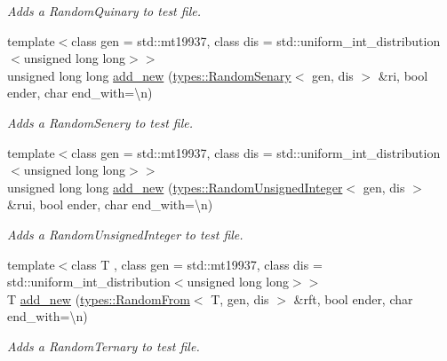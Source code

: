 \begin{DoxyCompactItemize}
\begin{DoxyCompactList}\small\item\em Adds a Random\+Quinary to test file. \end{DoxyCompactList}\item 
{\footnotesize template$<$class gen  = std\+::mt19937, class dis  = std\+::uniform\+\_\+int\+\_\+distribution$<$unsigned long long$>$$>$ }\\unsigned long long \mbox{\hyperlink{classtestcaser_1_1maker_1_1TestCaseBuilder_a6317c09b2b8896fb4da31f1daf401ff6}{add\+\_\+new}} (\mbox{\hyperlink{structtestcaser_1_1maker_1_1types_1_1RandomSenary}{types\+::\+Random\+Senary}}$<$ gen, dis $>$ \&ri, bool ender, char end\+\_\+with=\textquotesingle{}\textbackslash{}n\textquotesingle{})
\begin{DoxyCompactList}\small\item\em Adds a Random\+Senery to test file. \end{DoxyCompactList}\item 
{\footnotesize template$<$class gen  = std\+::mt19937, class dis  = std\+::uniform\+\_\+int\+\_\+distribution$<$unsigned long long$>$$>$ }\\unsigned long long \mbox{\hyperlink{classtestcaser_1_1maker_1_1TestCaseBuilder_a2aca9bbe3ad8017be98e4bb53e04face}{add\+\_\+new}} (\mbox{\hyperlink{classtestcaser_1_1maker_1_1types_1_1RandomUnsignedInteger}{types\+::\+Random\+Unsigned\+Integer}}$<$ gen, dis $>$ \&rui, bool ender, char end\+\_\+with=\textquotesingle{}\textbackslash{}n\textquotesingle{})
\begin{DoxyCompactList}\small\item\em Adds a Random\+Unsigned\+Integer to test file. \end{DoxyCompactList}\item 
{\footnotesize template$<$class T , class gen  = std\+::mt19937, class dis  = std\+::uniform\+\_\+int\+\_\+distribution$<$unsigned long long$>$$>$ }\\T \mbox{\hyperlink{classtestcaser_1_1maker_1_1TestCaseBuilder_a77245550881f3f91fd644ed71f37d0e8}{add\+\_\+new}} (\mbox{\hyperlink{structtestcaser_1_1maker_1_1types_1_1RandomFrom}{types\+::\+Random\+From}}$<$ T, gen, dis $>$ \&rft, bool ender, char end\+\_\+with=\textquotesingle{}\textbackslash{}n\textquotesingle{})
\begin{DoxyCompactList}\small\item\em Adds a Random\+Ternary to test file. \end{DoxyCompactList}\item 

\end{DoxyCompactItemize}
